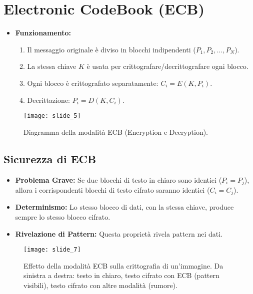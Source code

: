 \documentclass{article}
\begin{document}
\section{Electronic CodeBook (ECB)}
\begin{itemize}
    \item \textbf{Funzionamento:}
    \begin{enumerate}
        \item Il messaggio originale è diviso in blocchi indipendenti ($P_1, P_2, \ldots, P_N$).
        \item La stessa chiave $K$ è usata per crittografare/decrittografare ogni blocco.
        \item Ogni blocco è crittografato separatamente: $C_i = E(K, P_i)$.
        \item Decrittazione: $P_i = D(K, C_i)$.
    \end{enumerate}
\end{itemize}
\begin{figure}[H]
    \centering
    \texttt{[image: slide\_5]} %
    \caption{Diagramma della modalità ECB (Encryption e Decryption).}
    \label{fig:ecb_mode}
\end{figure}

\subsection{Sicurezza di ECB}
\begin{itemize}
    \item \textbf{Problema Grave:} Se due blocchi di testo in chiaro sono identici ($P_i = P_j$), allora i corrispondenti blocchi di testo cifrato saranno identici ($C_i = C_j$).
    \item \textbf{Determinismo:} Lo stesso blocco di dati, con la stessa chiave, produce sempre lo stesso blocco cifrato.
    \item \textbf{Rivelazione di Pattern:} Questa proprietà rivela pattern nei dati.
\end{itemize}
\begin{figure}[H]
    \centering
    \texttt{[image: slide\_7]} %
    \caption{Effetto della modalità ECB sulla crittografia di un'immagine. Da sinistra a destra: testo in chiaro, testo cifrato con ECB (pattern visibili), testo cifrato con altre modalità (rumore).}
    \label{fig:ecb_penguin}
\end{figure}
\end{document}
